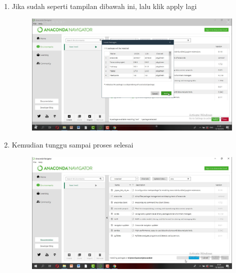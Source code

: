 \begin{enumerate}
\begin{enumerate}
\begin{enumerate}
\begin{figure}[h]
    \caption{}
    \label{fig:my_label}
\end{figure}
\item Jika sudah seperti tampilan dibawah ini, lalu klik apply lagi
\begin{figure}[h]
    \centering
    \includegraphics[scale=0.2]{gambar/23.png}
    \caption{}
    \label{fig:my_label}
\end{figure}
\item Kemudian tunggu sampai proses selesai
\begin{figure}[h]
    \centering
    \includegraphics[scale=0.2]{gambar/24.png}
    \caption{}
    \label{fig:my_label}
\end{figure}

\end{enumerate}
\end{enumerate}
\end{enumerate}
